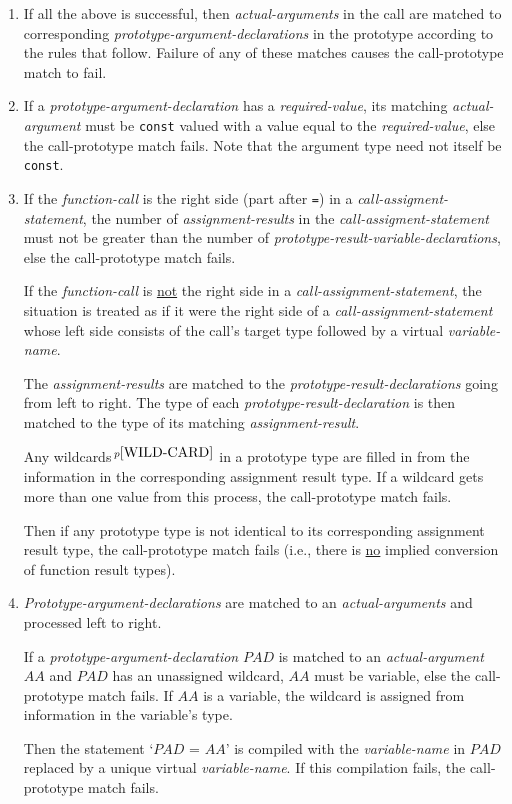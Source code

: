 \documentclass[12pt]{article}
\newcommand{\pagnote}[1]{$\,^{p\pageref{#1}}$}
\begin{document}
\begin{enumerate}
\item If all the above is successful, then {\em actual-arguments}
in the call are matched to corresponding {\em prototype-argument-declarations}
in the prototype according to the rules that follow.
Failure of any of these matches causes
the call-prototype match to fail.

\item If a {\em prototype-argument-declaration} has a {\em required-value},
its matching {\em actual-argument} must be {\tt const} valued with
a value equal to the {\em required-value}, else the call-prototype
match fails.  Note that the argument type need not itself be {\tt const}.

\item If the {\em function-call} is the right side (part after {\tt =})
in a {\em call-assigment-statement},
the number of {\em assignment-results} in the {\em call-assigment-statement}
must not be greater than the number of
{\em prototype-result-variable-declarations}, else the call-prototype
match fails.

If the {\em function-call} is \underline{not} the right side in a
{\em call-assignment-statement}, the situation is treated as if
it were the right side of a {\em call-assignment-statement}
whose left side consists of the call's target type
followed by a virtual {\em variable-name}.

The {\em assignment-results} are matched to the
{\em prototype-result-declarations} going from left to right.
The type of each {\em prototype-result-declaration} is then
matched to the type of its matching {\em assignment-result}.

Any wildcards\pagnote{WILD-CARD}
in a prototype type are filled in from the information
in the corresponding assignment result type.  If a wildcard gets more
than one value from this process, the call-prototype match fails.

Then if any prototype type is not identical to its corresponding
assignment result type, the call-prototype match fails
(i.e., there is \underline{no} implied conversion of function result
types).

\item {\em Prototype-argument-declarations} are matched to
an {\em actual-arguments} and processed left to right.

If a {\em prototype-argument-declaration} $PAD$ is matched
to an {\em actual-argument} $AA$ and  $PAD$ has an unassigned wildcard,
$AA$ must be variable, else the
call-prototype match fails.  If $AA$ is a variable, the
wildcard is assigned from information in the variable's type.

Then the statement `$PAD$ = $AA$' is compiled with
the {\em variable-name} in $PAD$ replaced by a unique virtual
{\em variable-name}.  If this compilation fails,
the call-prototype match fails.

\end{enumerate}
\end{document}
